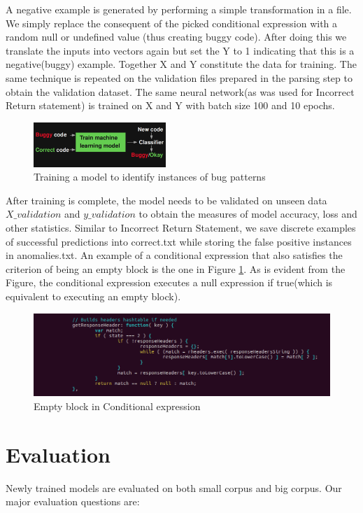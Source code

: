 \documentclass[sigconf]{acmart}
\begin{document}
\newline A negative example is generated by performing a simple transformation in a file. We simply replace the consequent of the picked conditional expression with a random null or undefined value (thus creating buggy code). After doing this we translate the inputs into vectors again but set the Y to 1 indicating that this is a negative(buggy) example. Together X and Y constitute the data for training. The same technique is repeated on the validation files prepared in the parsing step to obtain the validation dataset. The same neural network(as was used for Incorrect Return statement) is trained on X and Y with batch size 100 and 10 epochs.
\begin{figure}[h!]
\includegraphics[width=50mm]{untitled(3).png}
\caption{Training a model to identify instances of bug patterns\cite{slidepradel}}
\end{figure}
\newline After training is complete, the model needs to be validated on unseen data $X\_validation$ and $y\_validation$ to obtain the measures of model accuracy, loss and other statistics. Similar to Incorrect Return Statement, we save discrete examples of successful predictions into correct.txt while storing the false positive instances in anomalies.txt. 
An example of a conditional expression that also satisfies the criterion of being an empty block is the one in Figure \ref{correct conditional}. As is evident from the Figure, the conditional expression executes a null expression if true(which is equivalent to executing an empty block).
\begin{figure}[!ht]
  \includegraphics[width= \linewidth]{correct conditional.png}
  \caption{\small Empty block in Conditional expression}\label{correct conditional}
\end{figure}

\section{Evaluation}
Newly trained models are evaluated on both small corpus and big corpus. Our major evaluation questions are:
\end{document}
